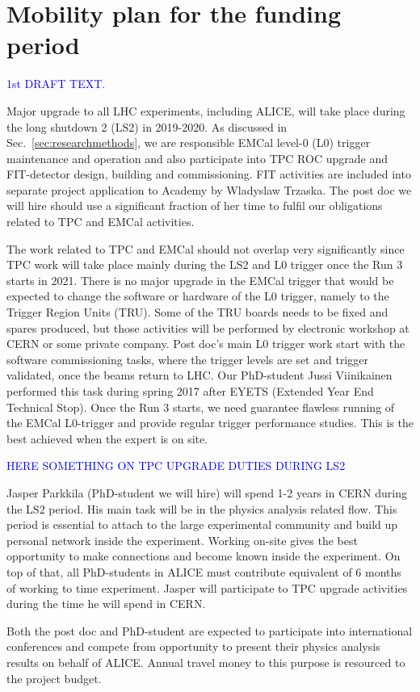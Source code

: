 \section{Mobility plan for the funding period}%
\label{sec:mobility}

\textcolor{blue}{1st DRAFT TEXT.}

Major upgrade to all LHC experiments, including ALICE, will take place during the long shutdown 2 (LS2) in 2019-2020. As discussed in Sec.~\ref{sec:researchmethods}, we are responsible EMCal level-0 (L0) trigger maintenance and operation and also participate into TPC ROC upgrade and FIT-detector design, building and commissioning. FIT activities are included into separate project application to Academy by Wladyslaw Trzaska. The post doc we will hire should use a significant fraction of her time to fulfil our obligations related to TPC and EMCal activities.

The work related to TPC and EMCal should not overlap very significantly since TPC work will take place mainly during the LS2 and L0 trigger once the Run 3 starts in 2021. There is no major upgrade in the EMCal trigger that would be expected to change the software or hardware of the L0 trigger, namely to the Trigger Region Units (TRU). Some of the TRU boards needs to be fixed and spares produced, but those activities will be performed by electronic workshop at CERN or some private company. Post doc’s main L0 trigger work start with the software commissioning tasks, where the trigger levels are set and trigger validated, once the beams return to LHC. Our PhD-student Jussi Viinikainen performed this task during spring 2017 after EYETS (Extended Year End Technical Stop). Once the Run 3 starts, we need guarantee flawless running of the EMCal L0-trigger and provide regular trigger performance studies. This is the best achieved when the expert is on site.

\textcolor{blue}{HERE SOMETHING ON TPC UPGRADE DUTIES DURING LS2}

Jasper Parkkila (PhD-student we will hire) will spend 1-2 years in CERN during the LS2 period. His main task will be in the physics analysis related flow. This period is essential to attach to the large experimental community and build up personal network inside the experiment. Working on-site gives the best opportunity to make connections and become known inside the experiment. On top of that, all PhD-students in ALICE must contribute equivalent of 6 months of working to time experiment. Jasper will participate to TPC upgrade activities during the time he will spend in CERN.

Both the post doc and PhD-student are expected to participate into international conferences and compete from opportunity to present their physics analysis results on behalf of ALICE. Annual travel money to this purpose is resourced to the project budget.

\nopagebreak
